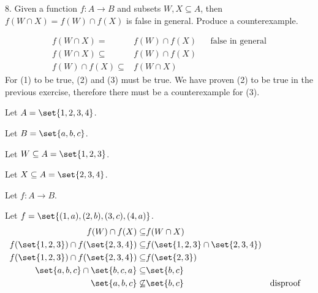 \documentclass{hippoidC}
\begin{document}
\begin{prooflist}{8. Given a function $f: A \rightarrow B$ and subsets $W, X \subseteq A$, then $f(W \cap X)=f(W) \cap f(X)$ is false in general. Produce a counterexample.}
\item \imagedef{}
\begin{align}
    f(W \cap X)=&f(W) \cap f(X) &&\text{false in general}\\
    f(W \cap X)\subseteq& f(W) \cap f(X) \\
    f(W) \cap f(X) \subseteq& f(W \cap X)
\end{align}
For (1) to be true, (2) and (3) must be true. We have proven (2) to be true in
the previous exercise, therefore there must be a counterexample for (3).
\item Let $A=\set{1, 2, 3, 4}$.
\item Let $B=\set{a, b, c}$.
\item Let $W\subseteq A = \set{1, 2, 3}$.
\item Let $X\subseteq A = \set{2, 3, 4}$.
\item Let $f: A \rightarrow B$.
\item Let $f = \set{(1, a), (2, b), (3, c), (4, a)}$.
\begin{align}
    f(W) \cap f(X) \subseteq& f(W \cap X)\\
    f(\set{1, 2, 3}) \cap f(\set{2, 3, 4}) \subseteq& f(\set{1, 2, 3} \cap \set{2, 3, 4})\\
    f(\set{1, 2, 3}) \cap f(\set{2, 3, 4}) \subseteq& f(\set{2, 3})\\
    \set{a, b, c} \cap \set{b, c, a} \subseteq& \set{b, c}\\
    \set{a, b, c} \not\subseteq& \set{b, c}&&\text{disproof}
\end{align}
\end{prooflist}
\end{document}
